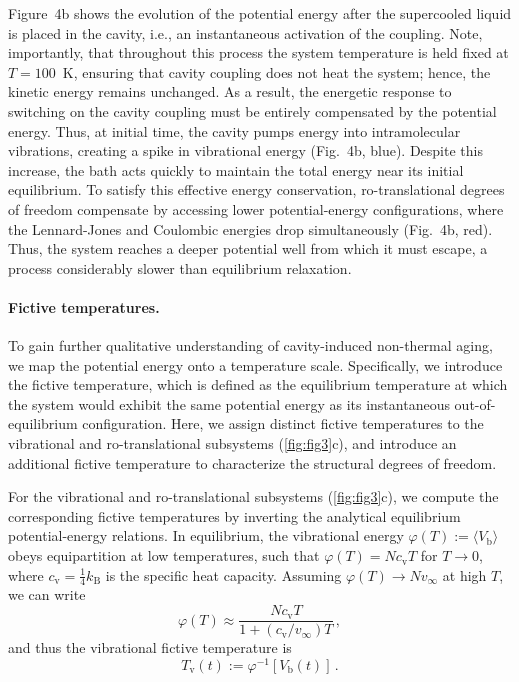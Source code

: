 \documentclass[aps, prl,
 reprint,
 superscriptaddress,
 citeautoscript,  %
 amsmath,amssymb,
 tightenlines
]{revtex4-2}
\begin{document}
Figure~4b shows the evolution of the potential energy after the supercooled liquid is placed in the cavity, i.e., an instantaneous activation of the coupling. Note, importantly, that throughout this process the system temperature is held fixed at $T = 100$~K, ensuring that cavity coupling does not heat the system; hence, the kinetic energy remains unchanged. As a result, the energetic response to switching on the cavity coupling must be entirely compensated by the potential energy. Thus, at initial time, the cavity pumps energy into intramolecular vibrations, creating a spike in vibrational energy (Fig.~4b, blue). Despite this increase, the bath acts quickly to maintain the total energy near its initial equilibrium. To satisfy this effective energy conservation, ro-translational degrees of freedom compensate by accessing lower potential-energy configurations, where the Lennard-Jones and Coulombic energies drop simultaneously (Fig.~4b, red). Thus, the system reaches a deeper potential well from which it must escape, a process considerably slower than equilibrium relaxation.


\paragraph*{Fictive temperatures.} To gain further qualitative understanding of cavity-induced non-thermal aging, we map the potential energy onto a temperature scale. Specifically, we introduce the fictive temperature, which is defined as the equilibrium temperature at which the system would exhibit the same potential energy as its instantaneous out-of-equilibrium configuration.\cite{dyre2018isomorph,dyre2020isomorph} Here, we assign distinct fictive temperatures to the vibrational and ro-translational subsystems (\cref{fig:fig3}c), and introduce an additional fictive temperature to characterize the structural degrees of freedom.

For the vibrational and ro-translational subsystems (\cref{fig:fig3}c), we compute the corresponding fictive temperatures by inverting the analytical equilibrium potential-energy relations. In equilibrium, the vibrational energy $\varphi(T) := \langle V_\mathrm{b} \rangle$ obeys equipartition at low temperatures, such that $\varphi(T) = N c_\mathrm{v} T$ for $T \to 0$, where $c_\mathrm{v} = \tfrac{1}{4} k_\mathrm{B}$ is the specific heat capacity. Assuming $\varphi(T) \to N v_\infty$ at high $T$, we can write 
\begin{equation}
    \varphi(T) \approx \frac{N c_\mathrm{v} T}{1+(c_\mathrm{v} /v_\infty)T  } \,,  \label{eq:vibenergy}
\end{equation}
and thus the vibrational fictive temperature is
\begin{equation}
T_\mathrm{v}(t) := \varphi^{-1}[V_\mathrm{b}(t)] \,. \label{eq:Tv}
\end{equation}
\end{document}
